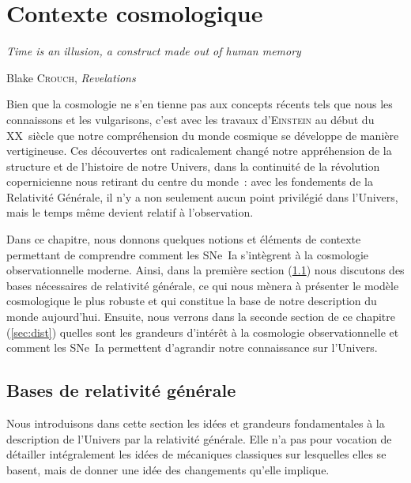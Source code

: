 \documentclass[../main/main.tex]{subfiles}
\begin{document}
\mainmatter


\chapter{Contexte cosmologique}\label{ch:cosmo}

\epigraph{\openquote\textit{Time is an illusion, a construct made out of human
memory}\closequote}{Blake \textsc{Crouch}, \textit{Revelations}}

Bien que la cosmologie ne s'en tienne pas aux concepts récents tels que nous les
connaissons et les vulgarisons, c'est avec les travaux d'\textsc{Einstein} au
début du XX\ieme~siècle que notre compréhension du monde cosmique se développe
de manière vertigineuse. Ces découvertes ont radicalement changé notre
appréhension de la structure et de l'histoire de notre Univers, dans la
continuité de la révolution copernicienne nous retirant du centre du monde~:
avec les fondements de la Relativité Générale, il n'y a non seulement aucun
point privilégié dans l'Univers, mais le temps même devient relatif à
l'observation.

Dans ce chapitre, nous donnons quelques notions et éléments de contexte
permettant de comprendre comment les SNe~Ia s'intègrent à la cosmologie
observationnelle moderne. Ainsi, dans la première section (\ref{sec:bases}) nous
discutons des bases nécessaires de relativité générale, ce qui nous mènera à
présenter le modèle cosmologique le plus robuste et qui constitue la base de
notre description du monde aujourd'hui. Ensuite, nous verrons dans la seconde
section de ce chapitre (\ref{sec:dist}) quelles sont les grandeurs d'intérêt à
la cosmologie observationnelle et comment les SNe~Ia permettent d'agrandir notre
connaissance sur l'Univers.

\vfill
\minitoc
\vfill

\newpage

\section{Bases de relativité générale}\label{sec:bases}

Nous introduisons dans cette section les idées et grandeurs fondamentales à la
description de l'Univers par la relativité générale. Elle n'a pas pour vocation
de détailler intégralement les idées de mécaniques classiques sur lesquelles
elles se basent, mais de donner une idée des changements qu'elle implique.
\end{document}
